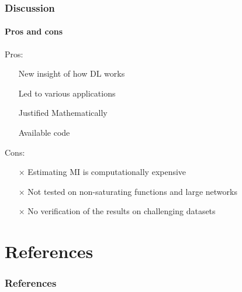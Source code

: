 \documentclass[10pt]{beamer}
\begin{document}
\begin{frame}
\frametitle{Discussion}
\framesubtitle{Pros and cons}
Pros:\\
    \begin{itemize}
        \item[\checkmark] New insight of how DL works
        \item[\checkmark] Led to various applications \cite{information-dropout, vib}
        \item[\checkmark] Justified Mathematically
        \item[\checkmark] Available code
        \\[0.5cm]
    \end{itemize}
Cons:\\
     \begin{itemize}
        \item[$\times$] Estimating MI is computationally expensive
        \item[$\times$] Not tested on non-saturating functions and large networks
        \item[$\times$] No verification of the results on challenging datasets
    \end{itemize}
\end{frame}


\section*{References}
\frametitle{References}


\end{document}
